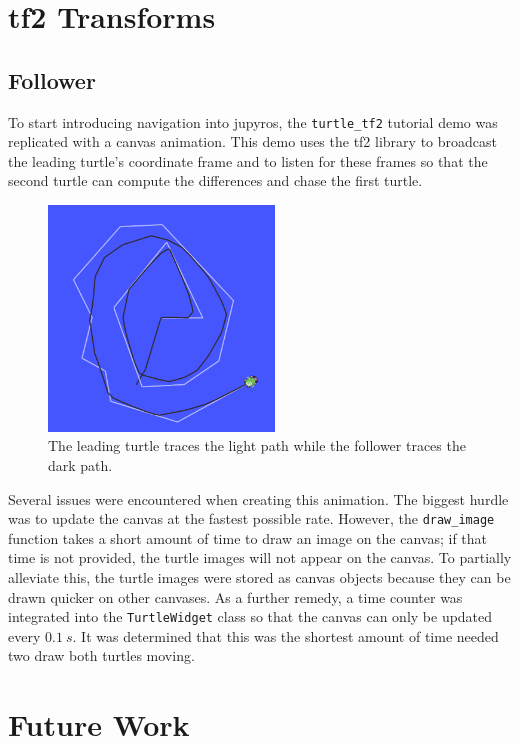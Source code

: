         
    
\section{tf2 Transforms}

    \subsection{Follower}
    
        To start introducing navigation into jupyros, the \texttt{turtle\_tf2} tutorial demo was replicated with a canvas animation. This demo uses the tf2 library to broadcast the leading turtle's coordinate frame and to listen for these frames so that the second turtle can compute the differences and chase the first turtle.
    
    \begin{figure}[hb]
        \centering
        \includegraphics[height=6cm]{Images/03_follower.png}
        \caption{The leading turtle traces the light path while the follower traces the dark path.}
        \label{fig:follower}
    \end{figure}
    
        Several issues were encountered when creating this animation. The biggest hurdle was to update the canvas at the fastest possible rate. However, the \texttt{draw\_image} function takes a short amount of time to draw an image on the canvas; if that time is not provided, the turtle images will not appear on the canvas. To partially alleviate this, the turtle images were stored as canvas objects because they can be drawn quicker on other canvases. As a further remedy, a time counter was integrated into the \texttt{TurtleWidget} class so that the canvas can only be updated every $0.1\ s$. It was determined that this was the shortest amount of time needed two draw both turtles moving.
    
\section{Future Work}

